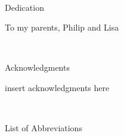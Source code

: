 \documentclass[12pt]{thesis}  %
\renewcommand{\baselinestretch}{2}
\begin{document}
\pagestyle{plain}
\setcounter{page}{2}


\renewcommand{\baselinestretch}{2}
\small\normalsize
\hbox{\ }
 
\vspace{-.65in}

\begin{center}
\large{Dedication}
\end{center} 

\begin{center}
To my parents, Philip and Lisa
\end{center} %

\renewcommand{\baselinestretch}{2}
\small\normalsize
\hbox{\ }
 
\vspace{-.65in}

\begin{center}
\large{Acknowledgments} 
\end{center} 

\vspace{1ex}

insert acknowledgments here
 
\renewcommand{\baselinestretch}{1}
\normalsize
{}
{}
\protect\tableofcontents %
\newpage
\protect\listoftables %
\newpage
\protect\listoffigures %
\newpage

{}

\renewcommand{\baselinestretch}{1}
\small\normalsize
\hbox{\ }

\vspace{-4em}

\begin{center}
\large{List of Abbreviations}
\end{center} 

\vspace{3pt}
\end{document}
